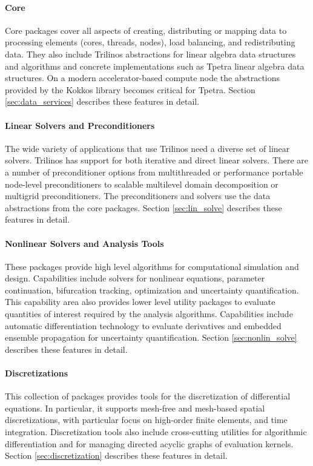 \paragraph{Core} Core packages cover all aspects of creating, distributing or mapping data to processing elements (cores, threads, nodes), load balancing, and redistributing data. They also include Trilinos abstractions for linear algebra data structures and algorithms and concrete implementations such as Tpetra linear algebra data structures. On a modern accelerator-based compute node the abstractions provided by the Kokkos library becomes critical for Tpetra. Section \ref{sec:data_services} describes these features in detail.
 
\paragraph{Linear Solvers and Preconditioners} The wide variety of applications that use Trilinos need a diverse set of linear solvers. Trilinos has support for both iterative and direct linear solvers. There are a number of preconditioner options from multithreaded or performance portable node-level preconditioners to scalable multilevel domain decomposition or multigrid preconditioners. The preconditioners and solvers use the data abstractions from the core packages. Section \ref{sec:lin_solve} describes these features in detail.

\paragraph{Nonlinear Solvers and Analysis Tools} These packages provide high level algorithms for computational simulation and design. Capabilities include solvers for nonlinear equations, parameter continuation, bifurcation tracking, optimization and uncertainty quantification. This capability area also provides lower level utility packages to evaluate quantities of interest required by the analysis algorithms. Capabilities include automatic differentiation technology to evaluate derivatives and embedded ensemble propagation for uncertainty quantification. Section \ref{sec:nonlin_solve} describes these features in detail.

\paragraph{Discretizations} This collection of packages provides tools for the discretization of differential equations. In particular, it supports mesh-free and mesh-based spatial discretizations, with particular focus on high-order finite elements, and time integration. Discretization tools also include cross-cutting utilities for algorithmic differentiation and for managing directed acyclic graphs of evaluation kernels. Section \ref{sec:discretization} describes these features in detail.

